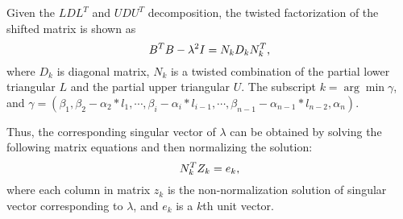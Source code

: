 Given the $LDL^T$ and $UDU^T$ decomposition, the twisted factorization of the shifted matrix is shown as
\begin{equation}
\vspace{-0.05in}
B^T B - \lambda^2 I = N_k D_k N_k^T ,
\vspace{-0.05in}
\label{eq:twisted}
\end{equation}
where $D_k$ is diagonal matrix, $N_k$ is a twisted combination of the partial lower triangular $L$ and the partial upper triangular $U$.
The subscript $k = \arg \min \gamma$, and $\gamma = (\beta_1, \beta_2 - \alpha_2 * l_1, \cdots, \beta_i - \alpha_i * l_{i-1}, \cdots, \beta_{n-1} - \alpha_{n-1} * l_{n-2}, \alpha_n)$.

Thus, the corresponding singular vector of $\lambda$ can be obtained by solving the following matrix equations and then normalizing the solution:
\begin{equation}
\label{eq:unnorm}
\vspace{-0.05in}
N_k^T Z_k = e_k ,
\vspace{-0.05in}
\end{equation}
 where each column in matrix $z_k$ is the non-normalization solution of singular vector corresponding to $\lambda$, and $e_k$ is a $k$th unit vector.


